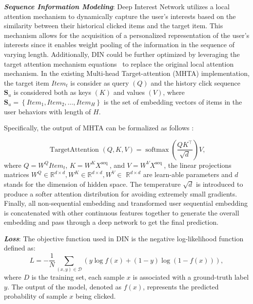 \textit{\textbf{Sequence Information Modeling}}: 
Deep Interest Network utilizes a local attention mechanism to dynamically capture the user's interests based on the similarity between their historical clicked items and the target item. 
This mechanism allows for the acquisition of a personalized representation of the user's interests since it enables weight pooling of the information in the sequence of varying length.
Additionally, DIN could be further optimized by leveraging the target attention mechanism equations~\cite{BST,transformer,pssa} to replace the original local attention mechanism. In the existing Multi-head Target-attention (MHTA) implementation, the target item $Item_t$ is consider as query $(Q)$ and the history click sequence $\boldsymbol{S}_u$ is considered both as keys $(K)$ and values $(V)$, where $\boldsymbol{S}_u=\left\{Item_1, Item_2, \ldots, Item_H\right\}$ is the set of embedding vectors of items in the user behaviors with length of $H$. 

Specifically, the output of MHTA can be formalized as follows :


\begin{equation}
\text { TargetAttention }(Q, K, V)=\operatorname{softmax}\left(\frac{Q K^{\top}}{\sqrt{d}}\right) V,
\end{equation}
where $Q =W^Q Item_t$, $K=W^K X^{\text {seq }}$, and $V=W^V X^{\text {seq }}$, the linear projections matrices $W^Q \in \mathbb{R}^{d \times d}, W^K \in \mathbb{R}^{d \times d}, W^V \in$ $\mathbb{R}^{d \times d}$ are learn-able parameters and $d$ stands for the dimension of hidden space. The temperature $\sqrt{d}$ is introduced to produce a softer attention distribution for avoiding extremely small gradients. Finally, all non-sequential embedding and transformed user sequential embedding is concatenated with other continuous features together to generate the overall embedding and pass through a deep network to get the final prediction.



\textit{\textbf{Loss}}: 
The objective function used in DIN is the negative log-likelihood function defined as:
\begin{equation}
L=-\frac{1}{N} \sum_{(x, y) \in \mathcal{D}}(y \log f(x)+(1-y) \log (1-f(x))),
\end{equation}
where $D$ is the training set, each sample $x$ is associated with a ground-truth label $y$. The output of the model, denoted as $f(x)$, represents the predicted probability of sample $x$ being clicked.

